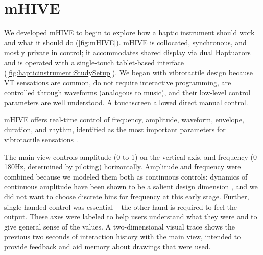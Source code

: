 





%
% 


\section{mHIVE}
We developed mHIVE to begin to explore how a haptic instrument should work and what it should do %
(\autoref{fig:mHIVE}).
%
%
mHIVE is collocated, synchronous, and mostly private in control; it accommodates shared display via dual
Haptuators~\cite{Yao2010}
and is operated with a single-touch tablet-based interface (\autoref{fig:hapticinstrument:StudySetup}). 
We began with vibrotactile design because VT
sensations are common, do not require interactive programming, are controlled through waveforms (analogous to music), and their low-level control parameters are well understood.
A touchscreen %
allowed %
direct manual control. %

mHIVE offers real-time control of frequency, amplitude, waveform, envelope, duration, and rhythm, identified as the most important parameters for vibrotactile sensations \cite{Gunther2002,Brown2006a,Brown2006,Brewster2004, Rovan2000}.

The main view controls amplitude (0 to 1) on the vertical axis, and frequency (0-180Hz, determined by piloting) 
horizontally. %
Amplitude and frequency were combined because we modeled them both as continuous controls: 
%
dynamics of continuous amplitude have been shown to be a salient design dimension \cite{Gunther2002, Brown2006}, and
we did not want to choose discrete bins for frequency at this early stage.
Further, single-handed control was essential -- the other hand is required to feel the output.
These axes were labeled to help users understand what they were and to give general sense of the values.
A two-dimensional visual trace shows the previous two seconds of interaction history with the main view, intended to provide feedback and aid memory about drawings that were used.

